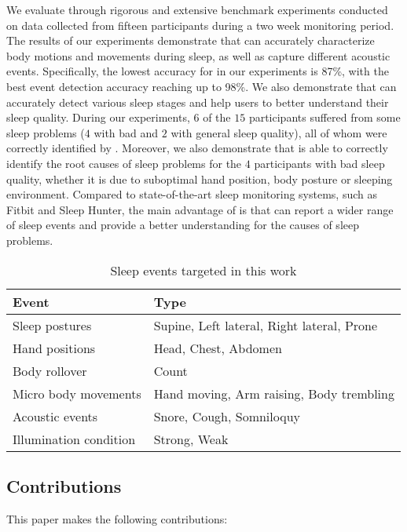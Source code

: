 We evaluate {\systemname} through rigorous and extensive benchmark experiments conducted on data collected from fifteen participants during a two week monitoring period. The results of our experiments demonstrate that {\systemname} can accurately characterize body motions and movements during sleep, as well as capture different acoustic events. Specifically, the lowest accuracy for {\systemname} in our experiments is 87\%, with the best event detection accuracy reaching up to 98\%. We also demonstrate that {\systemname} can accurately detect various sleep stages and help users to better understand their sleep quality. During our experiments, $6$ of the $15$ participants suffered from some sleep problems ($4$ with bad and $2$ with general sleep quality), all of whom were correctly identified by {\systemname}. Moreover, we also demonstrate that {\systemname} is able to correctly identify the root causes of sleep problems for the $4$ participants with bad sleep quality, whether it is due to suboptimal hand position, body posture or sleeping environment. Compared to state-of-the-art sleep monitoring systems, such as Fitbit and Sleep Hunter, the main advantage of {\systemname} is that can report a wider range of sleep events and provide a better understanding for the causes of sleep problems.

\begin{table}[!t]
 \caption{\label{tab:test}Sleep events targeted in this work}
 \centering
 \begin{tabular}{ll}
  \toprule
  \textbf{Event}& \textbf{Type} \\
  \midrule
\rowcolor{Gray}  Sleep postures & Supine, Left lateral, Right lateral, Prone\\
 Hand positions & Head, Chest, Abdomen\\
\rowcolor{Gray} Body rollover & Count\\
 Micro body movements& Hand moving, Arm raising, Body trembling \\
\rowcolor{Gray} Acoustic events & Snore, Cough, Somniloquy  \\
 Illumination condition & Strong, Weak  \\
  \bottomrule
 \end{tabular}
\end{table}


\subsection*{Contributions}
This paper makes the following contributions:

